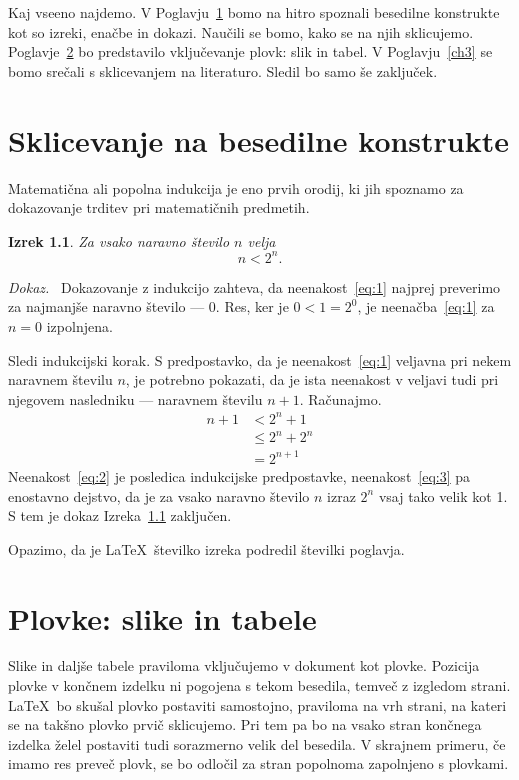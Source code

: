 \documentclass[a4paper, 12pt]{book}
\newtheorem{izrek}{Izrek}[chapter]
\newenvironment{dokaz}{\emph{Dokaz.}\ }{\hspace{\fill}{$\Box$}}
\begin{document}
Kaj vseeno najdemo. V Poglavju~\ref{ch1} bomo na hitro spoznali besedilne konstrukte kot so izreki, enačbe in dokazi. Naučili se bomo, kako se na njih sklicujemo. Poglavje~\ref{ch2} bo predstavilo vključevanje plovk: slik in tabel. V Poglavju~\ref{ch3} se bomo srečali s sklicevanjem na literaturo.
Sledil bo samo še zaključek.

\chapter{Sklicevanje na besedilne konstrukte}
\label{ch1}
Matematična ali popolna indukcija je eno prvih orodij, ki jih spoznamo za dokazovanje trditev pri matematičnih predmetih. 
\begin{izrek}
\label{iz:1}
Za vsako naravno število $n$ velja
\begin{equation}
n < 2^n.
\label{eq:1}
\end{equation}
\end{izrek}
\begin{dokaz}
Dokazovanje z indukcijo zahteva, da neenakost~\eqref{eq:1} najprej preverimo za najmanjše naravno število --- $0$. Res, ker je $0 < 1 = 2^0$, je neenačba~\eqref{eq:1} za $n=0$ izpolnjena.

Sledi indukcijski korak. S predpostavko, da je neenakost~\eqref{eq:1} veljavna pri nekem naravnem številu $n$, je potrebno pokazati, da je ista neenakost v veljavi tudi pri njegovem nasledniku --- naravnem številu $n+1$. Računajmo.
\begin{align}
n+1 &< 2^n + 1  \label{eq:2}\\
    &\le 2^n + 2^n \label{eq:3}\\
    &= 2^{n+1} \nonumber
\end{align} 
Neenakost~\eqref{eq:2} je posledica indukcijske predpostavke, neenakost~\eqref{eq:3} pa enostavno dejstvo, da je za vsako naravno število $n$ izraz $2^n$ vsaj tako velik kot 1. S tem je dokaz Izreka~\ref{iz:1} zaključen.
\end{dokaz}

Opazimo, da je \LaTeX\ številko izreka podredil številki poglavja.


\chapter{Plovke: slike in tabele}
\label{ch2}
Slike in daljše tabele praviloma vključujemo v dokument kot plovke. Pozicija plovke v končnem izdelku ni pogojena s tekom besedila, temveč z izgledom strani. \LaTeX\ bo skušal plovko postaviti samostojno, praviloma na vrh strani, na kateri se na takšno plovko prvič sklicujemo. Pri tem pa bo na vsako stran končnega izdelka želel postaviti tudi sorazmerno velik del besedila. V skrajnem primeru, če imamo res preveč plovk, se bo odločil za stran popolnoma zapolnjeno s plovkami.
\end{document}
